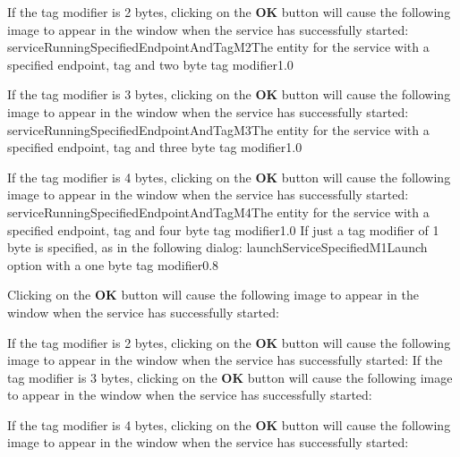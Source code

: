 If the tag modifier is 2 bytes, clicking on the \textbf{OK} button will cause the
following image to appear in the \emph{\MMMU} window when the service has successfully
started:
%
{serviceRunningSpecifiedEndpointAndTagM2}{The \emph{\MMMU} entity for the service with a
specified endpoint, tag and two byte tag modifier}{1.0}

If the tag modifier is 3 bytes, clicking on the \textbf{OK} button will cause the
following image to appear in the \emph{\MMMU} window when the service has successfully
started:
%
{serviceRunningSpecifiedEndpointAndTagM3}{The \emph{\MMMU} entity for the service with a
specified endpoint, tag and three byte tag modifier}{1.0}

If the tag modifier is 4 bytes, clicking on the \textbf{OK} button will cause the
following image to appear in the \emph{\MMMU} window when the service has successfully
started:
%
{serviceRunningSpecifiedEndpointAndTagM4}{The \emph{\MMMU} entity for the service with a
specified endpoint, tag and four byte tag modifier}{1.0}
\condPage{}
If just a tag modifier of 1 byte is specified, as in the following dialog:
%
{launchServiceSpecifiedM1}{Launch option with a one byte tag modifier}{0.8}

Clicking on the \textbf{OK} button will cause the following image to appear in the
\emph{\MMMU} window when the service has successfully started:

If the tag modifier is 2 bytes, clicking on the \textbf{OK} button will cause the
following image to appear in the \emph{\MMMU} window when the service has successfully
started:
\condPage{}
If the tag modifier is 3 bytes, clicking on the \textbf{OK} button will cause the
following image to appear in the \emph{\MMMU} window when the service has successfully
started:

If the tag modifier is 4 bytes, clicking on the \textbf{OK} button will cause the
following image to appear in the \emph{\MMMU} window when the service has successfully
started:
\appendixEnd{}
